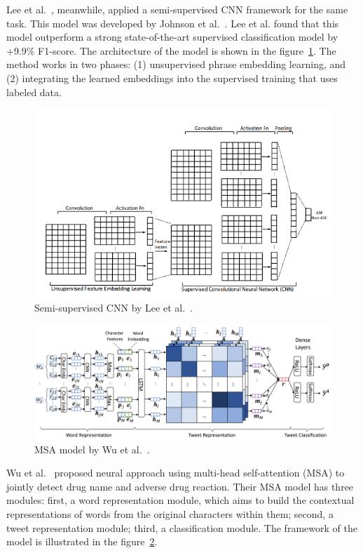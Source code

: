 Lee et al.~\cite{lee2017adverse}, meanwhile, applied a semi-supervised CNN framework for the same task. This model was developed by Johnson et al.~\cite{johnson2015semi}. Lee et al. found that this model outperform a strong state-of-the-art supervised classification model by +9.9\% F1-score. The architecture of the model is shown in the figure~\ref{fig:architecture-lee}. The method works in two phases: (1) unsupervised phrase embedding learning, and (2) integrating the learned embeddings into the supervised training that uses labeled data.

\begin{figure}[h]
	\centering
	\includegraphics[width=0.99\linewidth]{Figures/l.png}
	\caption{Semi-supervised CNN by Lee et al.~\cite{lee2017adverse}.}
	\label{fig:architecture-lee}
\end{figure}

\begin{figure}[ht]
	\centering
	\includegraphics[width=0.99\linewidth]{Figures/k.png}
	\caption{MSA model by Wu et al.~\cite{wu2019msa}.}
	\label{fig:architecture-wu-msa}
\end{figure}

Wu et al.~\cite{wu2019msa} proposed neural approach using multi-head self-attention (MSA) to jointly detect drug name and adverse drug reaction. Their MSA model has three modules: first, a word representation module, which aims to build the contextual representations of words from the original characters within them; second, a tweet representation module; third, a classification module. The framework of the model is illustrated in the figure~\ref{fig:architecture-wu-msa}.

